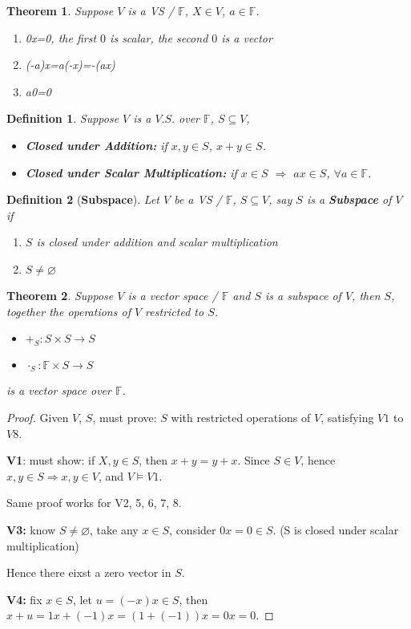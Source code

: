 \documentclass[12pt]{article}
\theoremstyle{plain}
\newtheorem{theorem}{Theorem}[subsection]
\newtheorem{definition}{Definition}[subsection]
\newcommand{\mF}{{\mathbb{F}}}
\let\emptyset\varnothing
\begin{document}
	\begin{theorem}
		Suppose $V$ is a VS / $\mathbb{F}$, $X\in V$, $a\in \mathbb{F}$. 
		\begin{enumerate}
			\item 0x=0, the first $0$ is scalar, the second $0$ is a vector
			\item (-a)x=a(-x)=-(ax)
			\item a0=0 \\
		\end{enumerate}
	\end{theorem}
	
	\begin{definition}
		Suppose $V$ is a $V.S.$ over $\mathbb{F}$, $S\subseteq V$, 
		\begin{itemize}
			\item \textbf{Closed under Addition:} 
				if $x, y \in S$, $x+y\in S$. 
			\item \textbf{Closed under Scalar Multiplication:} 
				if $x\in S$ $\Rightarrow$ $ax\in S$, $\forall a\in \mathbb{F}$.\\
		\end{itemize}
	\end{definition}
	
	\begin{definition}[\textbf{Subspace}]
		Let $V$ be a VS / $\mathbb{F}$, $S\subseteq V$, say $S$ is a \textbf{
		Subspace} of $V$ if 
		\begin{enumerate}
			\item $S$ is closed under addition and scalar multiplication
			\item $S\neq \emptyset$\\
		\end{enumerate}
	\end{definition}

	\begin{theorem}
		Suppose $V$ is a vector space / $\mathbb{F}$ and $S$ is a subspace of 
		$V$, then $S$, together the operations of $V$ restricted to $S$.
		\begin{itemize}
			\item $+_S : S \times S \to S$
			\item $\cdot_S : \mathbb{F} \times S \to S$
		\end{itemize}
		is a vector space over $\mF$. 
	\end{theorem}
	\begin{proof}
		Given $V$, $S$, must prove: $S$ with restricted operations of $V$, 
		satisfying $V1$ to $V8$. 

		\textbf{V1}: must show: if $X, y \in S$, then $x + y = y + x$. 
			Since $S\in V$, hence $x, y \in S \Rightarrow x, y \in V$, and 
			$V \models V1$.

		Same proof works for V2, 5, 6, 7, 8.

		\textbf{V3:} know $S\neq \emptyset$, take any $x\in S$, consider
		$0x=0 \in S$. (S is closed under scalar multiplication)

		Hence there eixst a zero vector in $S$.

		\textbf{V4:} fix $x\in S$, let $u = (-x)x \in S$,
		then $x + u = 1x + (-1)x = (1+(-1))x=0x=0$.
	\end{proof}
\end{document}
